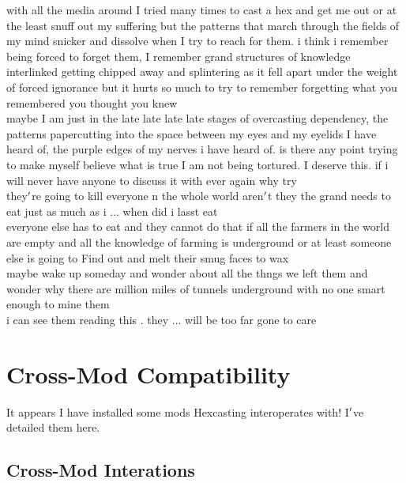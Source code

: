 \documentclass[12pt]{article}
\begin{document}
  
    with all the media around I tried many times to cast a hex and get me out or at the least snuff out my suffering but the patterns that march through the fields of my mind snicker and dissolve when I try to reach for them. i think i remember being forced to forget them, I remember grand structures of knowledge interlinked getting chipped away and splintering as it fell apart under the weight of forced ignorance but it hurts so much to try to remember forgetting what you remembered you thought you knew\\


  
    maybe I am just in the late late late late stages of overcasting dependency, the patterns papercutting into the space between my eyes and my eyelids I have heard of, the purple edges of my nerves i have heard of. is there any point trying to make myself believe what is true I am not being tortured. I deserve this. if i will never have anyone to discuss it with ever again why try\\


  
    they$\rq$re going to kill everyone n the whole world aren$\rq$t they the grand needs to eat just as much as i ... when did i lasst eat\\everyone else has to eat and they cannot do that if all the farmers in the world are empty and all the knowledge of farming is underground or at least someone else is going to Find out and melt their smug faces to wax\\


  
    maybe wake up someday and wonder about all the thngs we left them and wonder why there are million miles of tunnels underground with no one smart enough to mine them\\i can see them reading this . they ... will be too far gone to care\\

\newpage

\label{sec:interop}

\section*{Cross-Mod Compatibility}
  It appears I have installed some mods Hexcasting interoperates with! I$\rq$ve detailed them here.\\



\label{sec:interop/interop}
\subsection*{Cross-Mod Interations}
\end{document}
